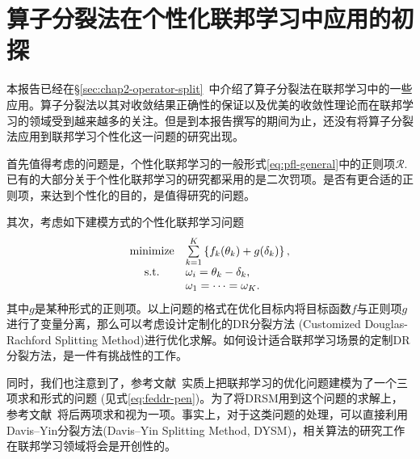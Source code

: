 \section{算子分裂法在个性化联邦学习中应用的初探}
\label{sec:chap3-pfl-os}



本报告已经在\S\ref{sec:chap2-operator-split}~中介绍了算子分裂法在联邦学习中的一些应用。算子分裂法以其对收敛结果正确性的保证\cite{pathak2020fedsplit}以及优美的收敛性理论\cite{ryu2022large}而在联邦学习的领域受到越来越多的关注。但是到本报告撰写的期间为止，还没有将算子分裂法应用到联邦学习个性化这一问题的研究出现。

首先值得考虑的问题是，个性化联邦学习的一般形式\eqref{eq:pfl-general}中的正则项$\mathcal{R}.$ 已有的大部分关于个性化联邦学习的研究\cite{hanzely2020federated, li_2021_ditto, t2020pfedme}都采用的是二次罚项。是否有更合适的正则项，来达到个性化的目的，是值得研究的问题。

其次，考虑如下建模方式的个性化联邦学习问题
\begin{equation}
\label{eq:customized-drsm}
\begin{array}{cl}
 \operatorname*{minimize} & \sum\limits_{k=1}^K \left\{ f_k(\theta_k) + g(\delta_k) \right\}, \\
 \text{s.t.} & \omega_i = \theta_k - \delta_k, \\
 & \omega_1 = \cdots = \omega_K.
\end{array}
\end{equation}
其中$g$是某种形式的正则项。以上问题的格式在优化目标内将目标函数$f$与正则项$g$进行了变量分离，那么可以考虑设计定制化的DR分裂方法 (Customized Douglas-Rachford Splitting Method)\cite{Han_2013_CDRSM}进行优化求解。如何设计适合联邦学习场景的定制DR分裂方法，是一件有挑战性的工作。

同时，我们也注意到了，参考文献\parencite{tran2021feddr}~实质上把联邦学习的优化问题建模为了一个三项求和形式的问题 (见式\eqref{eq:feddr-pen})。为了将DRSM用到这个问题的求解上，参考文献\parencite{tran2021feddr}~将后两项求和视为一项。事实上，对于这类问题的处理，可以直接利用Davis–Yin分裂方法(Davis–Yin Splitting Method, DYSM)\cite{ryu2022large, Davis_2017_DYS, Liu_2019_DYS}，相关算法的研究工作在联邦学习领域将会是开创性的。
